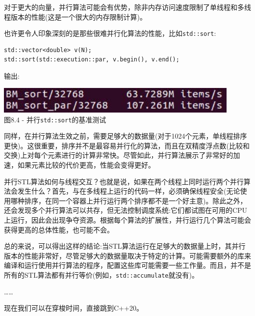 对于更大的向量，并行算法可能会有优势，除非内存访问速度限制了单线程和多线程版本的性能(这是一个很大的内存限制计算)。

也许更令人印象深刻的是那些很难并行化算法的性能，比如\texttt{std::sort}:

\begin{lstlisting}[style=styleCXX]
std::vector<double> v(N);
std::sort(std::execution::par, v.begin(), v.end();
\end{lstlisting}

输出:

\begin{center}
\includegraphics[width=0.9\textwidth]{content/2/chapter8/images/4.jpg}\\
图8.4 - 并行\texttt{std::sort}的基准测试
\end{center}

同样，在并行算法生效之前，需要足够大的数据量(对于1024个元素，单线程排序更快)。这很重要，排序并不是最容易并行化的算法，而且在双精度浮点数(比较和交换)上对每个元素进行的计算非常快。尽管如此，并行算法展示了非常好的加速，如果元素比较的代价更高，性能会变得更好。 

并行STL算法如何与线程交互？也就是说，如果在两个线程上同时运行两个并行算法会发生什么？首先，与在多线程上运行的代码一样，必须确保线程安全(无论使用哪种排序，在同一个容器上并行运行两个排序都不是一个好主意)。除此之外，还会发现多个并行算法可以共存，但无法控制调度系统:它们都试图在可用的CPU上运行，因此会出现争夺资源。根据每个算法的扩展性，并行运行几个算法可能会获得更高的总体性能，也可能不会。

总的来说，可以得出这样的结论:当STL算法运行在足够大的数据量上时，其并行版本的性能非常好，尽管足够大的数据量取决于特定的计算。可能需要额外的库来编译和运行使用并行算法的程序，配置这些库可能需要一些工作量。而且，并不是所有的STL算法都有并行等价(例如，\texttt{std::accumulate}就没有)。

……

现在我们可以在穿梭时间，直接跳到C++20。














